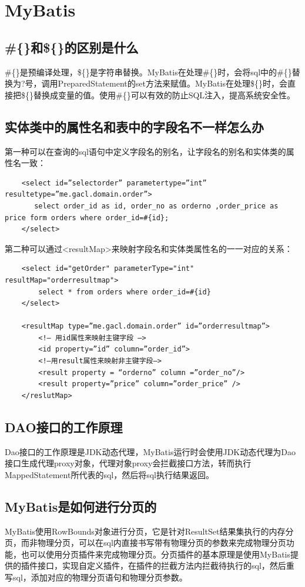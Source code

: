 \section{MyBatis}
\subsection{\#\{\}和\$\{\}的区别是什么}
\#\{\}是预编译处理，\$\{\}是字符串替换。MyBatis在处理\#\{\}时，会将sql中的\#\{\}替换为?号，调用PreparedStatement的set方法来赋值。MyBatis在处理\$\{\}时，会直接把\$\{\}替换成变量的值。使用\#\{\}可以有效的防止SQL注入，提高系统安全性。

\subsection{实体类中的属性名和表中的字段名不一样怎么办}
第一种可以在查询的sql语句中定义字段名的别名，让字段名的别名和实体类的属性名一致：
\begin{verbatim}
    <select id=”selectorder” parametertype=”int” resultetype=”me.gacl.domain.order”>
       select order_id as id, order_no as orderno ,order_price as price form orders where order_id=#{id};
    </select>
\end{verbatim}
第二种可以通过<resultMap>来映射字段名和实体类属性名的一一对应的关系：
\begin{verbatim}
    <select id="getOrder" parameterType="int" resultMap="orderresultmap">
        select * from orders where order_id=#{id}
    </select>

    <resultMap type=”me.gacl.domain.order” id=”orderresultmap”>
        <!– 用id属性来映射主键字段 –>
        <id property=”id” column=”order_id”>
        <!–用result属性来映射非主键字段–>
        <result property = “orderno” column =”order_no”/>
        <result property=”price” column=”order_price” />
    </reslutMap>
\end{verbatim}

\subsection{DAO接口的工作原理}
Dao接口的工作原理是JDK动态代理，MyBatis运行时会使用JDK动态代理为Dao接口生成代理proxy对象，代理对象proxy会拦截接口方法，转而执行MappedStatement所代表的sql，然后将sql执行结果返回。

\subsection{MyBatis是如何进行分页的}
MyBatis使用RowBounds对象进行分页，它是针对ResultSet结果集执行的内存分页，而非物理分页，可以在sql内直接书写带有物理分页的参数来完成物理分页功能，也可以使用分页插件来完成物理分页。分页插件的基本原理是使用MyBatis提供的插件接口，实现自定义插件，在插件的拦截方法内拦截待执行的sql，然后重写sql，添加对应的物理分页语句和物理分页参数。

